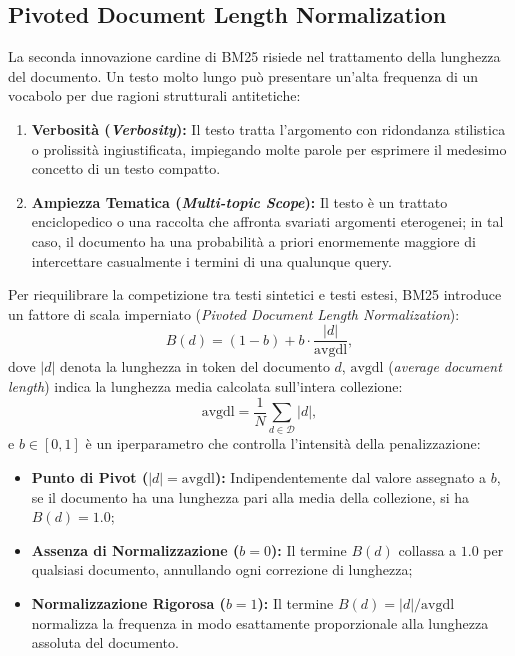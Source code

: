 \FloatBarrier
\subsection{Pivoted Document Length Normalization}
\label{subsec:bm25-length-norm}
La seconda innovazione cardine di BM25 risiede nel trattamento della lunghezza del documento. Un testo molto lungo pu\`o presentare un'alta frequenza di un vocabolo per due ragioni strutturali antitetiche:
\begin{enumerate}
    \item \textbf{Verbosit\`a (\textit{Verbosity}):} Il testo tratta l'argomento con ridondanza stilistica o prolissit\`a ingiustificata, impiegando molte parole per esprimere il medesimo concetto di un testo compatto.
    \item \textbf{Ampiezza Tematica (\textit{Multi-topic Scope}):} Il testo \`e un trattato enciclopedico o una raccolta che affronta svariati argomenti eterogenei; in tal caso, il documento ha una probabilit\`a a priori enormemente maggiore di intercettare casualmente i termini di una qualunque query.
\end{enumerate}

Per riequilibrare la competizione tra testi sintetici e testi estesi, BM25 introduce un fattore di scala imperniato (\textit{Pivoted Document Length Normalization}):
\begin{equation}
B(d) = (1 - b) + b \cdot \frac{|d|}{\text{avgdl}},
\label{eq:bm25-length-normalizer}
\end{equation}
dove $|d|$ denota la lunghezza in token del documento $d$, $\text{avgdl}$ (\textit{average document length}) indica la lunghezza media calcolata sull'intera collezione:
\begin{equation}
\text{avgdl} = \frac{1}{N} \sum_{d \in \mathcal{D}} |d|,
\end{equation}
e $b \in [0, 1]$ \`e un iperparametro che controlla l'intensit\`a della penalizzazione:
\begin{itemize}
    \item \textbf{Punto di Pivot ($|d| = \text{avgdl}$):} Indipendentemente dal valore assegnato a $b$, se il documento ha una lunghezza pari alla media della collezione, si ha $B(d) = 1.0$;
    \item \textbf{Assenza di Normalizzazione ($b = 0$):} Il termine $B(d)$ collassa a $1.0$ per qualsiasi documento, annullando ogni correzione di lunghezza;
    \item \textbf{Normalizzazione Rigorosa ($b = 1$):} Il termine $B(d) = |d| / \text{avgdl}$ normalizza la frequenza in modo esattamente proporzionale alla lunghezza assoluta del documento.
\end{itemize}

